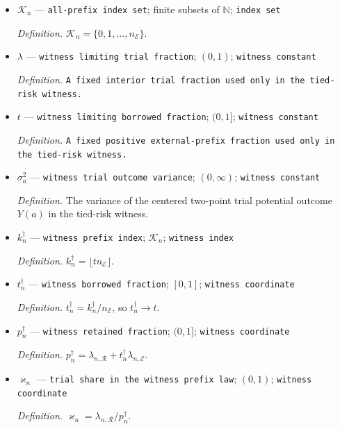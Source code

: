 \documentclass{article}
\begin{document}
\begin{itemize}
  \par\smallskip\noindent\emph{Definition.} For \(z=(x,y,v)\), \(U_n(z)=P_n\{s_n(Z)<s_n(z)\mid R=0\}+vP_n\{s_n(Z)=s_n(z)\mid R=0\}\).
  \item \(\mathcal K_n\) --- \texttt{all-\allowbreak{}prefix index set}; finite subsets of \(\mathbb N\); \texttt{index set}
  \par\smallskip\noindent\emph{Definition.} \(\mathcal K_n=\{0,1,\ldots,n_{\mathcal E}\}\).
  \item \(\lambda\) --- \texttt{witness limiting trial fraction}; \((0,1)\); \texttt{witness constant}
  \par\smallskip\noindent\emph{Definition.} \texttt{A fixed interior trial fraction used only in the tied-\allowbreak{}risk witness.}
  \item \(t\) --- \texttt{witness limiting borrowed fraction}; \((0,1]\); \texttt{witness constant}
  \par\smallskip\noindent\emph{Definition.} \texttt{A fixed positive external-\allowbreak{}prefix fraction used only in the tied-\allowbreak{}risk witness.}
  \item \(\sigma_a^2\) --- \texttt{witness trial outcome variance}; \((0,\infty)\); \texttt{witness constant}
  \par\smallskip\noindent\emph{Definition.} The variance of the centered two-point trial potential outcome \(Y(a)\) in the tied-risk witness.
  \item \(k_n^{\dagger}\) --- \texttt{witness prefix index}; \(\mathcal K_n\); \texttt{witness index}
  \par\smallskip\noindent\emph{Definition.} \(k_n^{\dagger}=\lfloor t n_{\mathcal E}\rfloor\).
  \item \(t_n^{\dagger}\) --- \texttt{witness borrowed fraction}; \([0,1]\); \texttt{witness coordinate}
  \par\smallskip\noindent\emph{Definition.} \(t_n^{\dagger}=k_n^{\dagger}/n_{\mathcal E}\), so \(t_n^{\dagger}\to t\).
  \item \(p_n^{\dagger}\) --- \texttt{witness retained fraction}; \((0,1]\); \texttt{witness coordinate}
  \par\smallskip\noindent\emph{Definition.} \(p_n^{\dagger}=\lambda_{n,\mathcal R}+t_n^{\dagger}\lambda_{n,\mathcal E}\).
  \item \(\varkappa_n\) --- \texttt{trial share in the witness prefix law}; \((0,1)\); \texttt{witness coordinate}
  \par\smallskip\noindent\emph{Definition.} \(\varkappa_n=\lambda_{n,\mathcal R}/p_n^{\dagger}\).

\end{itemize}
\end{document}
